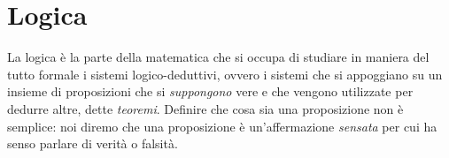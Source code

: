 \chapter{Logica}

La logica è la parte della matematica che si occupa di studiare in maniera del tutto formale i sistemi logico-deduttivi, ovvero i sistemi che si appoggiano su un insieme di proposizioni che si \emph{suppongono} vere e che vengono utilizzate per dedurre altre, dette \emph{teoremi}.
Definire che cosa sia una proposizione non è semplice: noi diremo che una proposizione è un'affermazione \emph{sensata} per cui ha senso parlare di verità o falsità. 

